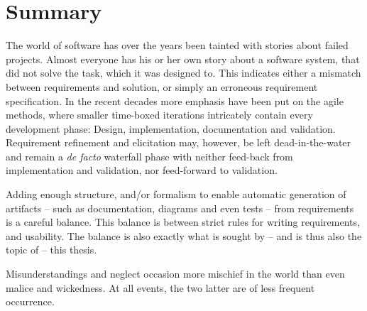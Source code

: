 \chapter{Summary}
The world of software has over the years been tainted with stories about failed projects. Almost everyone has his or her own story about a software system, that did not solve the task, which it was designed to. This indicates either a mismatch between requirements and solution, or simply an erroneous requirement specification. In the recent decades more emphasis have been put on the agile methods, where smaller time-boxed iterations intricately contain every development phase: Design, implementation, documentation and validation. Requirement refinement and elicitation may, however, be left dead-in-the-water and remain a \emph{de facto} waterfall phase with neither feed-back from implementation and validation, nor feed-forward to validation.\bigskip

\noindent Adding enough structure, and/or formalism to enable automatic generation of artifacts -- such as documentation, diagrams and even tests -- from requirements is a careful balance. This balance is between strict rules for writing requirements, and usability. 
The balance is also exactly what is sought by -- and is thus also the topic of -- this thesis.
\newpage
\begin{fquote}Misunderstandings and neglect occasion more mischief in the world than even malice and wickedness. At all events, the two latter are of less frequent occurrence.
\end{fquote}